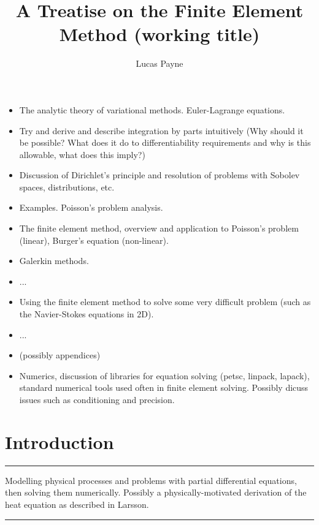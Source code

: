 \documentclass{article}
\title{A Treatise on the Finite Element Method
\scriptsize{(working title)}
}
\author{Lucas Payne}
\newcommand{\todo}[1]{\vskip 0.1in \hrule \vskip 0.03in {#1} \vskip 0.03in \hrule \vskip 0.1in}
\begin{document}
\maketitle

% 
% 


\begin{itemize}
\item The analytic theory of variational methods.
      Euler-Lagrange equations.
\item Try and derive and describe integration by parts intuitively (Why should it be possible? What does it do to differentiability
requirements and why is this allowable, what does this imply?)
\item Discussion of Dirichlet's principle and resolution of problems with Sobolev spaces, distributions, etc.
\item Examples. Poisson's problem analysis.

\item The finite element method, overview and application to Poisson's problem (linear), Burger's equation (non-linear).
\item Galerkin methods.

\item ...
\item Using the finite element method to solve some very difficult problem (such as the Navier-Stokes equations in 2D).
\item ...
\item (possibly appendices)
\item Numerics, discussion of libraries for equation solving (petsc, linpack, lapack),
standard numerical tools used often in finite element solving. Possibly dicuss issues
such as conditioning and precision.


\end{itemize}
\newpage


\tableofcontents
\newpage

\section{Introduction}
\todo{
Modelling physical processes and problems with partial differential equations, then solving them numerically.
Possibly a physically-motivated derivation of the heat equation as described in Larsson.

}
\end{document}
